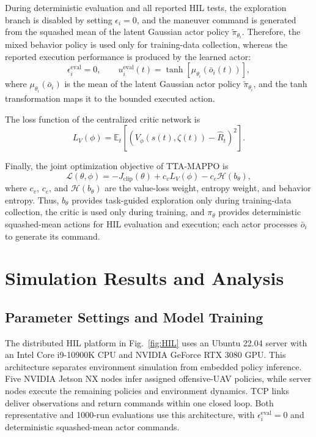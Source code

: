 \documentclass{cja}
\begin{document}
During deterministic evaluation and all reported HIL tests, the exploration branch is disabled by setting $\epsilon_i=0$, and the maneuver command is generated from the squashed mean of the latent Gaussian actor policy $\widetilde\pi_{\theta_i}$. Therefore, the mixed behavior policy is used only for training-data collection, whereas the reported execution performance is produced by the learned actor:
\begin{equation}
\epsilon_i^{\mathrm{eval}}=0,
\qquad
u_i^{\mathrm{eval}}(t)
=
\tanh
\left[
\mu_{\theta_i}
\left(
\bar o_i(t)
\right)
\right],
\end{equation}
where $\mu_{\theta_i}(\bar o_i)$ is the mean of the latent Gaussian actor policy $\widetilde\pi_{\theta_i}$, and the tanh transformation maps it to the bounded executed action.

The loss function of the centralized critic network is
\begin{equation}
L_V(\phi)
=
\mathbb E_t
\left[
\left(
V_{\phi}(s(t),\zeta(t))
-
\hat R_t
\right)^2
\right].
\end{equation}

Finally, the joint optimization objective of TTA-MAPPO is
\begin{equation}
\mathcal L(\theta,\phi)
=
-J_{\mathrm{clip}}(\theta)
+
c_v L_V(\phi)
-
c_e\mathcal H(b_{\theta}),
\end{equation}
where $c_v$, $c_e$, and $\mathcal H(b_{\theta})$ are the value-loss weight, entropy weight, and behavior entropy. Thus, $b_\theta$ provides task-guided exploration only during training-data collection, the critic is used only during training, and $\pi_\theta$ provides deterministic squashed-mean actions for HIL evaluation and execution; each actor processes $\bar o_i$ to generate its command.

\section{Simulation Results and Analysis}
\label{subsec:v71-case-study}

\subsection{Parameter Settings and Model Training}
\label{subsec:algo-net-setting}

The distributed HIL platform in Fig.~\ref{fig:HIL} uses an Ubuntu 22.04 server with an Intel Core i9-10900K CPU and NVIDIA GeForce RTX 3080 GPU. This architecture separates environment simulation from embedded policy inference. Five NVIDIA Jetson NX nodes infer assigned offensive-UAV policies, while server nodes execute the remaining policies and environment dynamics. TCP links deliver observations and return commands within one closed loop. Both representative and 1000-run evaluations use this architecture, with $\epsilon_i^{\mathrm{eval}}=0$ and deterministic squashed-mean actor commands.
\end{document}
